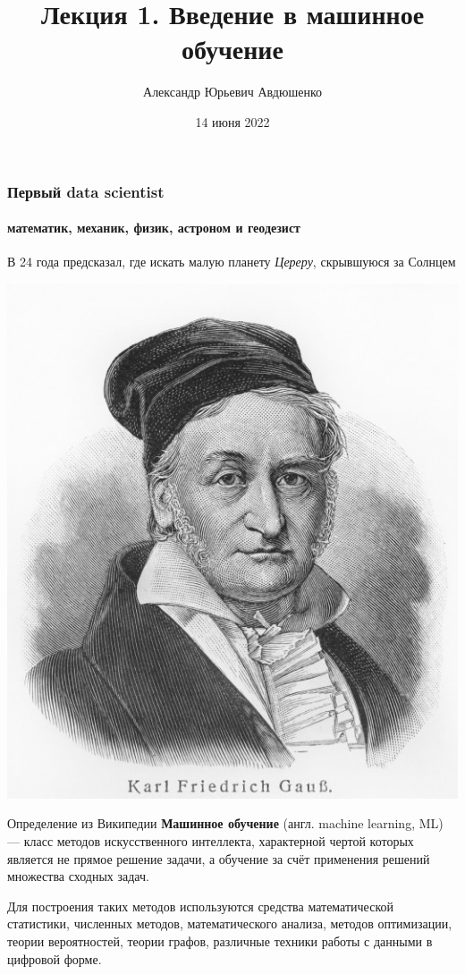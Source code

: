 \documentclass[fullscreen=true, bookmarks=true, hyperref={pdfencoding=unicode}]{beamer}
\title{Лекция 1. Введение в машинное обучение}
\author{Александр Юрьевич Авдюшенко}
\institute{МКН СПбГУ, ШАД}
\date{14 июня 2022}
\begin{document}

\begin{frame}
\transdissolve[duration=0.2]
\titlepage
\end{frame}

\begin{frame}
  \frametitle{Первый data scientist}
  \framesubtitle{математик, механик, физик, астроном и геодезист}
  \pause
  В 24 года предсказал, где искать малую планету \textit{Цереру}, скрывшуюся за Солнцем
  \pause
  \begin{center}
    \includegraphics[keepaspectratio,
                     height=0.7\paperheight]{carl-gauss.jpg}
  \end{center}
\end{frame}


\begin{frame}
  \begin{block}{Определение из Википедии}
    \textbf{Машинное обучение} (англ. machine learning, ML) — класс методов искусственного интеллекта, характерной чертой которых является не прямое решение задачи, а обучение за счёт применения решений множества сходных задач.
  \end{block}

  \vspace{1cm}
  Для построения таких методов используются средства математической статистики, численных методов, математического анализа, методов оптимизации, теории вероятностей, теории графов, различные техники работы с данными в цифровой форме.
\end{frame}
\end{document}
